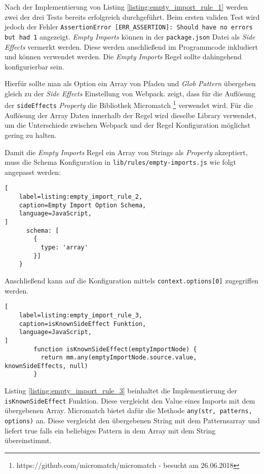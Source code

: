 Nach der Implementierung von Listing \ref{listing:empty_import_rule_1} werden zwei der drei Tests bereits erfolgreich durchgeführt.  Beim ersten validen Test wird jedoch der Fehler \lstinline{AssertionError [ERR_ASSERTION]: Should have no errors but had 1} angezeigt. \textit{Empty Imports} können in der \lstinline{package.json} Datei als \textit{Side Effects} vermerkt werden. Diese werden anschließend im Programmcode inkludiert und können verwendet werden. Die \textit{Empty Imports} Regel sollte dahingehend konfigurierbar sein.

Hierfür sollte man als Option ein Array von Pfaden und \textit{Glob Pattern} übergeben gleich zu der \textit{Side Effects} Einstellung von Webpack. \textcite{WebpackTreeShaking} zeigt, dass für die Auflösung der \lstinline{sideEffects} \textit{Property} die Bibliothek Micromatch \footnote{https://github.com/micromatch/micromatch - besucht am 26.06.2018} verwendet wird. Für die Auflösung der Array Daten innerhalb der Regel wird dieselbe Library verwendet, um die Unterschiede zwischen Webpack und der Regel Konfiguration möglichst gering zu halten.

Damit die \textit{Empty Imports} Regel ein Array von Strings als \textit{Property} akzeptiert, muss die Schema Konfiguration in \lstinline{lib/rules/empty-imports.js} wie folgt angepasst werden:

\begin{lstlisting}[
    label=listing:empty_import_rule_2,
	caption=Empty Import Option Schema,
	language=JavaScript,
]
      schema: [
        {
          type: 'array'
        }]
    }
\end{lstlisting}

Anschließend kann auf die Konfiguration mittels \lstinline{context.options[0]} zugegriffen werden.

\begin{lstlisting}[
    label=listing:empty_import_rule_3,
	caption=isKnownSideEffect Funktion,
	language=JavaScript,
]
        function isKnownSideEffect(emptyImportNode) {
          return mm.any(emptyImportNode.source.value, knownSideEffects, null)
        }
\end{lstlisting}

Listing \ref{listing:empty_import_rule_3} beinhaltet die Implementierung der \lstinline{isKnownSideEffect} Funktion. Diese vergleicht den Value eines Imports mit dem übergebenen Array. Micromatch bietet dafür die Methode \lstinline{any(str, patterns, options)} an. Diese vergleicht den übergebenen String mit dem Patternsarray und liefert true falls ein beliebiges Pattern in dem Array mit dem String übereinstimmt.

